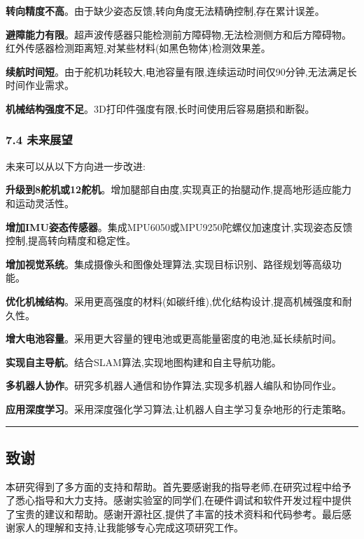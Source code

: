 \documentclass[
]{article}
\begin{document}
\textbf{转向精度不高}。由于缺少姿态反馈,转向角度无法精确控制,存在累计误差。

\textbf{避障能力有限}。超声波传感器只能检测前方障碍物,无法检测侧方和后方障碍物。红外传感器检测距离短,对某些材料(如黑色物体)检测效果差。

\textbf{续航时间短}。由于舵机功耗较大,电池容量有限,连续运动时间仅90分钟,无法满足长时间作业需求。

\textbf{机械结构强度不足}。3D打印件强度有限,长时间使用后容易磨损和断裂。

\hypertarget{ux672aux6765ux5c55ux671b}{%
\subsubsection{7.4 未来展望}\label{ux672aux6765ux5c55ux671b}}

未来可以从以下方向进一步改进:

\textbf{升级到8舵机或12舵机}。增加腿部自由度,实现真正的抬腿动作,提高地形适应能力和运动灵活性。

\textbf{增加IMU姿态传感器}。集成MPU6050或MPU9250陀螺仪加速度计,实现姿态反馈控制,提高转向精度和稳定性。

\textbf{增加视觉系统}。集成摄像头和图像处理算法,实现目标识别、路径规划等高级功能。

\textbf{优化机械结构}。采用更高强度的材料(如碳纤维),优化结构设计,提高机械强度和耐久性。

\textbf{增大电池容量}。采用更大容量的锂电池或更高能量密度的电池,延长续航时间。

\textbf{实现自主导航}。结合SLAM算法,实现地图构建和自主导航功能。

\textbf{多机器人协作}。研究多机器人通信和协作算法,实现多机器人编队和协同作业。

\textbf{应用深度学习}。采用深度强化学习算法,让机器人自主学习复杂地形的行走策略。

\begin{center}\rule{0.5\linewidth}{0.5pt}\end{center}

\hypertarget{ux81f4ux8c22}{%
\subsection{致谢}\label{ux81f4ux8c22}}

本研究得到了多方面的支持和帮助。首先要感谢我的指导老师,在研究过程中给予了悉心指导和大力支持。感谢实验室的同学们,在硬件调试和软件开发过程中提供了宝贵的建议和帮助。感谢开源社区,提供了丰富的技术资料和代码参考。最后感谢家人的理解和支持,让我能够专心完成这项研究工作。
\end{document}
